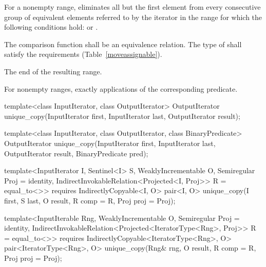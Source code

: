 \begin{itemdescr}
\pnum
\effects
For a nonempty range, eliminates all but the first element from every
consecutive group of equivalent elements referred to by the iterator
in the range
for which the following conditions hold:
or
.

\begin{removedblock}
\pnum
\requires
The comparison function shall be an equivalence relation.
The type of  shall satisfy the
 requirements (Table~\ref{moveassignable}).
\end{removedblock}

\pnum
\returns
The end of the resulting range.

\pnum
\complexity
For nonempty ranges, exactly
applications of the corresponding predicate.
\end{itemdescr}

%
\begin{removedblock}
\begin{itemdecl}
template<class InputIterator, class OutputIterator>
  OutputIterator
    unique_copy(InputIterator first, InputIterator last,
                OutputIterator result);

template<class InputIterator, class OutputIterator,
         class BinaryPredicate>
  OutputIterator
    unique_copy(InputIterator first, InputIterator last,
                OutputIterator result, BinaryPredicate pred);
\end{itemdecl}
\end{removedblock}
\begin{addedblock}
\begin{itemdecl}
template<InputIterator I, Sentinel<I> S, WeaklyIncrementable O,
    Semiregular Proj = identity, IndirectInvokableRelation<Projected<I, Proj>> R = equal_to<>>
  requires IndirectlyCopyable<I, O>
  pair<I, O>
    unique_copy(I first, S last, O result, R comp = R{}, Proj proj = Proj{});

template<InputIterable Rng, WeaklyIncrementable O, Semiregular Proj = identity,
    IndirectInvokableRelation<Projected<IteratorType<Rng>, Proj>> R = equal_to<>>
  requires IndirectlyCopyable<IteratorType<Rng>, O>
  pair<IteratorType<Rng>, O>
    unique_copy(Rng& rng, O result, R comp = R{}, Proj proj = Proj{});
\end{itemdecl}
\end{addedblock}

